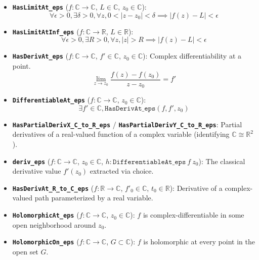 \documentclass[11pt]{article}
\begin{document}
\begin{itemize}
    \item \textbf{\texttt{HasLimitAt\_eps}} ($f : \mathbb{C} \to \mathbb{C}$, $L \in \mathbb{C}$, $z_0 \in \mathbb{C}$):
    \[ \forall \epsilon > 0, \exists \delta > 0, \forall z, 0 < |z - z_0| < \delta \implies |f(z) - L| < \epsilon \]
    
    \item \textbf{\texttt{HasLimitAtInf\_eps}} ($f : \mathbb{C} \to \mathbb{R}$, $L \in \mathbb{R}$):
    \[ \forall \epsilon > 0, \exists R > 0, \forall z, |z| > R \implies |f(z) - L| < \epsilon \]
    
    \item \textbf{\texttt{HasDerivAt\_eps}} ($f : \mathbb{C} \to \mathbb{C}$, $f' \in \mathbb{C}$, $z_0 \in \mathbb{C}$): Complex differentiability at a point.
    \[ \lim_{z \to z_0} \frac{f(z) - f(z_0)}{z - z_0} = f' \]
    
    \item \textbf{\texttt{DifferentiableAt\_eps}} ($f : \mathbb{C} \to \mathbb{C}$, $z_0 \in \mathbb{C}$):
    \[ \exists f' \in \mathbb{C}, \texttt{HasDerivAt\_eps}(f, f', z_0) \]
    
    \item \textbf{\texttt{HasPartialDerivX\_C\_to\_R\_eps}} / \textbf{\texttt{HasPartialDerivY\_C\_to\_R\_eps}}: Partial derivatives of a real-valued function of a complex variable (identifying $\mathbb{C} \cong \mathbb{R}^2$).
    
    \item \textbf{\texttt{deriv\_eps}} ($f : \mathbb{C} \to \mathbb{C}$, $z_0 \in \mathbb{C}$, $h : \texttt{DifferentiableAt\_eps}\ f\ z_0$): The classical derivative value $f'(z_0)$ extracted via choice.
    
    \item \textbf{\texttt{HasDerivAt\_R\_to\_C\_eps}} ($f : \mathbb{R} \to \mathbb{C}$, $f'_0 \in \mathbb{C}$, $t_0 \in \mathbb{R}$): Derivative of a complex-valued path parameterized by a real variable.
    
    \item \textbf{\texttt{HolomorphicAt\_eps}} ($f : \mathbb{C} \to \mathbb{C}$, $z_0 \in \mathbb{C}$): $f$ is complex-differentiable in some open neighborhood around $z_0$.
    
    \item \textbf{\texttt{HolomorphicOn\_eps}} ($f : \mathbb{C} \to \mathbb{C}$, $G \subset \mathbb{C}$): $f$ is holomorphic at every point in the open set $G$.
\end{itemize}
\end{document}
